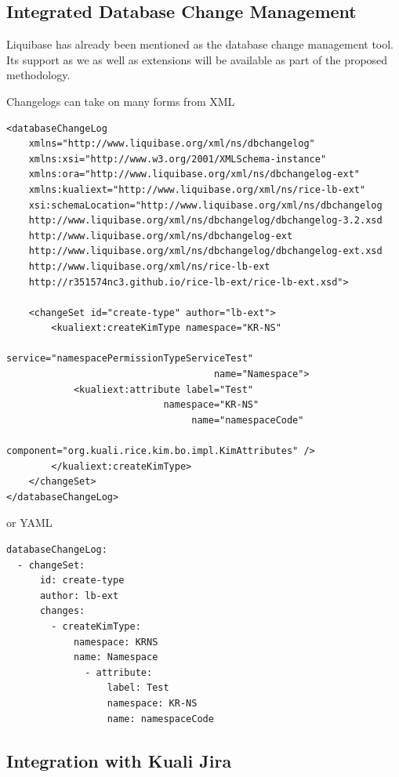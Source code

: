 \documentclass[12pt]{report}
\begin{document}
\subsection{Integrated Database Change Management}

Liquibase has already been mentioned as the database change management tool. Its support as we as well as extensions will be available
as part of the proposed methodology.

Changelogs can take on many forms from XML
\begin{verbatim}
<databaseChangeLog
    xmlns="http://www.liquibase.org/xml/ns/dbchangelog"
    xmlns:xsi="http://www.w3.org/2001/XMLSchema-instance"
    xmlns:ora="http://www.liquibase.org/xml/ns/dbchangelog-ext"
    xmlns:kualiext="http://www.liquibase.org/xml/ns/rice-lb-ext"
    xsi:schemaLocation="http://www.liquibase.org/xml/ns/dbchangelog 
    http://www.liquibase.org/xml/ns/dbchangelog/dbchangelog-3.2.xsd
	http://www.liquibase.org/xml/ns/dbchangelog-ext
    http://www.liquibase.org/xml/ns/dbchangelog/dbchangelog-ext.xsd
	http://www.liquibase.org/xml/ns/rice-lb-ext 
    http://r351574nc3.github.io/rice-lb-ext/rice-lb-ext.xsd">

    <changeSet id="create-type" author="lb-ext">
        <kualiext:createKimType namespace="KR-NS" 
                                  service="namespacePermissionTypeServiceTest" 
                                     name="Namespace">
	        <kualiext:attribute label="Test" 
                            namespace="KR-NS" 
                                 name="namespaceCode" 
                            component="org.kuali.rice.kim.bo.impl.KimAttributes" />
        </kualiext:createKimType>
    </changeSet>
</databaseChangeLog>
\end{verbatim}

or YAML

\begin{verbatim}
databaseChangeLog:
  - changeSet:
      id: create-type
      author: lb-ext
      changes:
        - createKimType:
            namespace: KRNS
            name: Namespace
              - attribute:
                  label: Test
                  namespace: KR-NS
                  name: namespaceCode
\end{verbatim}

\subsection{Integration with Kuali Jira}
\end{document}
